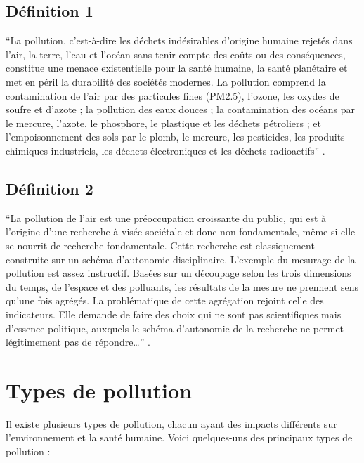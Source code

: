 \documentclass{report}
\begin{document}
\subsection{Définition 1}

\enquote{La pollution, c'est-à-dire les déchets indésirables d'origine humaine rejetés dans l'air, la terre, l'eau et l'océan sans tenir compte des coûts ou des conséquences, constitue une menace existentielle pour la santé humaine, la santé planétaire et met en péril la durabilité des sociétés modernes. La pollution comprend la contamination de l'air par des particules fines (PM2.5), l'ozone, les oxydes de soufre et d'azote ; la pollution des eaux douces ; la contamination des océans par le mercure, l'azote, le phosphore, le plastique et les déchets pétroliers ; et l'empoisonnement des sols par le plomb, le mercure, les pesticides, les produits chimiques industriels, les déchets électroniques et les déchets radioactifs} \cite{Prof. Dr. Guibin Jiang and Prof. Dr. Hongqiang Ren,2022}.

\subsection{Définition 2}

\enquote{La pollution de l'air est une préoccupation croissante du public, qui est à l'origine d'une recherche à visée sociétale et donc non fondamentale, même si elle se nourrit de recherche fondamentale. Cette recherche est classiquement construite sur un schéma d'autonomie disciplinaire. L'exemple du mesurage de la pollution est assez instructif. Basées sur un découpage selon les trois dimensions du temps, de l'espace et des polluants, les résultats de la mesure ne prennent sens qu'une fois agrégés. La problématique de cette agrégation rejoint celle des indicateurs. Elle demande de faire des choix qui ne sont pas scientifiques mais d'essence politique, auxquels le schéma d'autonomie de la recherche ne permet légitimement pas de répondre…} \cite{HAL,2013}.



\section{Types de pollution}
Il existe plusieurs types de pollution, chacun ayant des impacts différents sur l'environnement et la santé humaine. Voici quelques-uns des principaux types de pollution :
\end{document}
